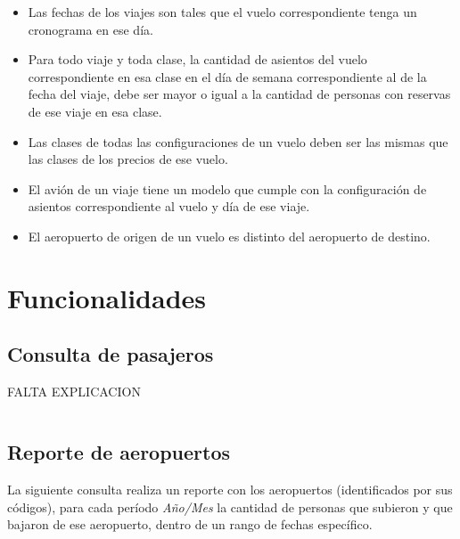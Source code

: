 \documentclass[a4paper,10pt]{article}
\begin{document}
\begin{itemize}

  \item Las fechas de los viajes son tales que el vuelo correspondiente tenga un cronograma en ese día.

  \item Para todo viaje y toda clase, la cantidad de asientos del vuelo correspondiente en esa clase en el día de semana correspondiente al de la fecha del viaje, debe ser mayor o igual a la cantidad de personas con reservas de ese viaje en esa clase.

  \item Las clases de todas las configuraciones de un vuelo deben ser las mismas que las clases de los precios de ese vuelo.

  \item El avión de un viaje tiene un modelo que cumple con la configuración de asientos correspondiente al vuelo y día de ese viaje.

  \item El aeropuerto de origen de un vuelo es distinto del aeropuerto de destino.

\end{itemize}

\newpage
\section{Funcionalidades}


\subsection{Consulta de pasajeros}

FALTA EXPLICACION

\begin{verbatim}

\end{verbatim}


\subsection{Reporte de aeropuertos}

La siguiente consulta realiza un reporte con los aeropuertos (identificados por sus códigos), para cada período \textit{Año/Mes} la cantidad de personas que subieron y que bajaron de ese aeropuerto,
dentro de un rango de fechas específico.
\end{document}
